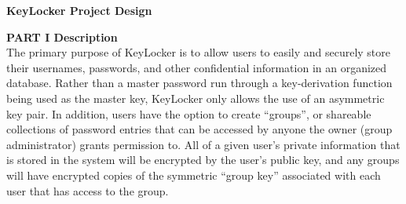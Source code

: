 \documentclass[11pt, letterpaper]{article}
\newcommand{\DesignSection}[1]
{\noindent\textbf{#1}\\}
\begin{document}
\centerline{\textbf{KeyLocker Project Design}}
\smallskip

\DesignSection{PART I Description}
\noindent
The primary purpose of KeyLocker is to allow users to easily and securely store their usernames, passwords, and other confidential information in an organized database. Rather than a master password run through a key-derivation function being used as the master key, KeyLocker only allows the use of an asymmetric key pair. In addition, users have the option to create “groups”, or shareable collections of password entries that can be accessed by anyone the owner (group administrator) grants permission to. All of a given user's private information that is stored in the system will be encrypted by the user's public key, and any groups will have encrypted copies of the symmetric “group key” associated with each user that has access to the group.
\end{document}
